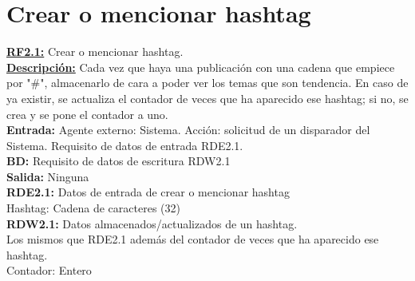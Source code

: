 



\section{Crear o mencionar hashtag}
\textbf{\textcolor{rojo}{\underline{RF2.1:}}} Crear o mencionar hashtag. \\[6pt]

\textbf{\textcolor{rojo}{\underline{Descripción:}}} Cada vez que haya una publicación con una cadena que empiece por "\#", almacenarlo de cara a poder ver los temas que son tendencia. En caso de ya existir, se actualiza el contador de veces que ha aparecido ese hashtag; si no, se crea y se pone el contador a uno.
 \\[6pt]

\textbf{\textcolor{rojo}{Entrada:}} Agente externo: Sistema. Acción: solicitud de un disparador del Sistema. 
Requisito de datos de entrada \textcolor{azul}{RDE2.1}. \\[6pt]

\textbf{\textcolor{rojo}{BD:}} Requisito de datos de escritura \textcolor{azul}{RDW2.1}\\[6pt]

\textbf{\textcolor{rojo}{Salida:}} Ninguna \\[6pt]

\textcolor{azul}{\textbf{RDE2.1:}} Datos de entrada de crear o mencionar hashtag \\
\hspace*{1cm} Hashtag: Cadena de caracteres (32) \\[12pt]

\textcolor{azul}{\textbf{RDW2.1:}} Datos almacenados/actualizados de un hashtag. \\
\hspace*{1cm} Los mismos que RDE2.1 además del contador de veces que ha aparecido ese hashtag.\\
\hspace*{1cm} Contador: Entero \\[12pt]


